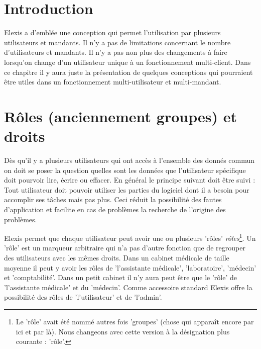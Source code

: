 
\section{Introduction}
Elexis a d'emblée une conception qui permet l'utilisation par plusieurs utilisateurs et mandants. Il n'y a pas de limitations concernant le nombre d'utilisateurs et mandants. Il n'y a pas non plus des changements à faire lorsqu'on change d'un utilisateur unique à un fonctionnement multi-client.
Dans ce chapitre il y aura juste la présentation de quelques conceptions qui pourraient être utiles dans un fonctionnement multi-utilisateur et multi-mandant.


\section{Rôles (anciennement groupes) et droits}
\label{sec:gruppen}
Dès qu'il y a plusieurs utilisateurs qui ont accès à l'ensemble des donnés commun on doit se poser la question quelles sont les données que l'utilisateur spécifique doit pourvoir lire, écrire ou effacer. En général le principe suivant doit être suivi : Tout utilisateur doit pouvoir utiliser les parties du logiciel dont il a besoin pour accomplir ses tâches mais pas plus. Ceci réduit la possibilité des fautes d'application et facilite en cas de problèmes la recherche de l'origine des problèmes.

Elexis permet que chaque utilisateur peut avoir une ou plusieurs 'rôles' \textit{rôles}\footnote{Le 'rôle' avait été nommé autres fois 'groupes' (chose qui apparaît encore par ici et par là). Nous changeons avec cette version à la désignation plus courante : 'rôle'.}. Un 'rôle' est un marqueur arbitraire qui n'a pas d'autre fonction que de regrouper des utilisateurs avec les mêmes droits. Dans un cabinet médicale de taille moyenne il peut y avoir les rôles de 'l'assistante médicale', 'laboratoire', 'médecin' et 'comptabilité'. Dans un petit cabinet il n'y aura peut être que le 'rôle' de 'l'assistante médicale' et du 'médecin'.  Comme accessoire standard Elexis offre la possibilité des rôles de 'l'utilisateur' et de 'l'admin'.

